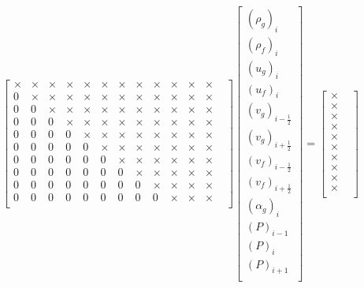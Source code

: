 \documentclass[11pt,letterpaper,titlepage]{article}
\newcommand{\half}{\frac{1}{2}}
\begin{document}
\begin{equation*}
\begin{aligned}
\begin{bmatrix}
\times & \times & \times & \times & \times & \times & \times & \times & \times & \times & \times & \times &\\
0      & \times & \times & \times & \times & \times & \times & \times & \times & \times & \times & \times &\\
0      & 0      & \times & \times & \times & \times & \times & \times & \times & \times & \times & \times &\\
0      & 0      & 0      & \times & \times & \times & \times & \times & \times & \times & \times & \times &\\
0      & 0      & 0      & 0      & \times & \times & \times & \times & \times & \times & \times & \times &\\
0      & 0      & 0      & 0      & 0      & \times & \times & \times & \times & \times & \times & \times &\\
0      & 0      & 0      & 0      & 0      & 0      & \times & \times & \times & \times & \times & \times &\\
0      & 0      & 0      & 0      & 0      & 0      & 0      & \times & \times & \times & \times & \times &\\
0      & 0      & 0      & 0      & 0      & 0      & 0      & 0      & \times & \times & \times & \times &\\
0      & 0      & 0      & 0      & 0      & 0      & 0      & 0      & 0      & \times & \times & \times &\\
\end{bmatrix}
\begin{bmatrix}
(\rho_g)_i  \\
(\rho_f)_i  \\
(u_g)_i \\
(u_f)_i \\
(v_g)_{i-\half}\\
(v_g)_{i+\half}\\
(v_f)_{i-\half}  \\
(v_f)_{i+\half}   \\
(\alpha_g)_i  \\
(P)_{i-1}  \\
(P)_{i}  \\
(P)_{i+1}  \\
\end{bmatrix}
=
\begin{bmatrix}
\times &\\ 
\times &\\ 
\times &\\ 
\times &\\ 
\times &\\ 
\times &\\ 
\times &\\ 
\times &\\ 
\times &\\
\times &\\
\end{bmatrix}
\end{aligned}
\end{equation*}
\end{document}
